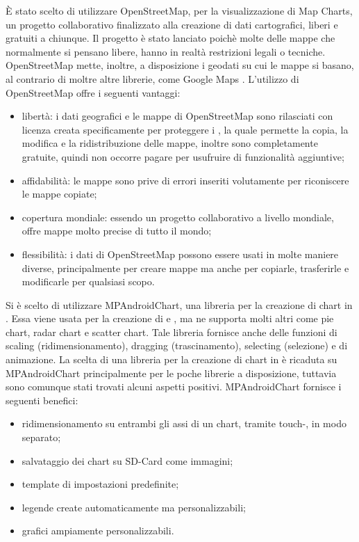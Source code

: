 È stato scelto di utilizzare OpenStreetMap, per la visualizzazione di Map Charts, un progetto collaborativo finalizzato alla creazione di dati cartografici, liberi e gratuiti a chiunque. Il progetto è stato lanciato poichè molte delle mappe che normalmente si pensano libere, hanno in realtà restrizioni legali o tecniche. OpenStreetMap mette, inoltre, a disposizione i geodati su cui le mappe si basano, al contrario di moltre altre librerie, come Google Maps .
L'utilizzo di OpenStreetMap offre i seguenti vantaggi:
\begin{itemize}
\item libertà: i dati geografici e le mappe di OpenStreetMap sono rilasciati con licenza creata specificamente per proteggere i , la quale permette la copia, la modifica e la ridistribuzione delle mappe, inoltre sono completamente gratuite, quindi non occorre pagare per usufruire di funzionalità aggiuntive;
\item affidabilità: le mappe sono prive di errori inseriti volutamente per riconiscere le mappe copiate;
\item copertura mondiale: essendo un progetto collaborativo a livello mondiale, offre mappe molto precise di tutto il mondo;
\item flessibilità: i dati di OpenStreetMap possono essere usati in molte maniere diverse, principalmente per creare mappe ma anche per copiarle, trasferirle e modificarle per qualsiasi scopo.
\end{itemize}

Si è scelto di utilizzare MPAndroidChart, una libreria per la creazione di chart in . Essa viene usata per la creazione di  e , ma ne supporta molti altri come pie chart, radar chart e scatter chart. Tale libreria fornisce anche delle funzioni di scaling (ridimensionamento), dragging (trascinamento), selecting (selezione) e di animazione. La scelta di una libreria per la creazione di chart in  è ricaduta su MPAndroidChart principalmente per le poche librerie a disposizione, tuttavia sono comunque stati trovati alcuni aspetti positivi.
MPAndroidChart fornisce i seguenti benefici:
\begin{itemize}
\item ridimensionamento su entrambi gli assi di un chart, tramite touch-, in modo separato;
\item salvataggio dei chart su SD-Card come immagini;
\item template di impostazioni predefinite;
\item legende create automaticamente ma personalizzabili;
\item grafici ampiamente personalizzabili.
\end{itemize}

